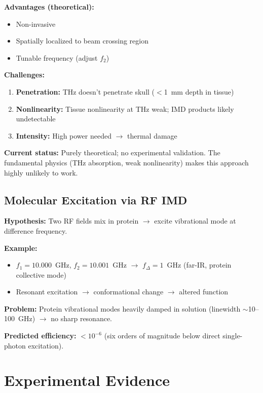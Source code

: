 \textbf{Advantages (theoretical):}
\begin{itemize}
\item Non-invasive
\item Spatially localized to beam crossing region
\item Tunable frequency (adjust $f_2$)
\end{itemize}

\textbf{Challenges:}
\begin{enumerate}
\item \textbf{Penetration:} THz doesn't penetrate skull ($<$1~mm depth in tissue)
\item \textbf{Nonlinearity:} Tissue nonlinearity at THz weak; IMD products likely undetectable
\item \textbf{Intensity:} High power needed $\rightarrow$ thermal damage
\end{enumerate}

\begin{warningbox}
\textbf{Current status:} Purely theoretical; no experimental validation. The fundamental physics (THz absorption, weak nonlinearity) makes this approach highly unlikely to work.
\end{warningbox}

\subsection{Molecular Excitation via RF IMD}

\textbf{Hypothesis:} Two RF fields mix in protein $\rightarrow$ excite vibrational mode at difference frequency.

\textbf{Example:}
\begin{itemize}
\item $f_1 = 10.000$~GHz, $f_2 = 10.001$~GHz $\rightarrow$ $f_{\Delta} = 1$~GHz (far-IR, protein collective mode)
\item Resonant excitation $\rightarrow$ conformational change $\rightarrow$ altered function
\end{itemize}

\textbf{Problem:} Protein vibrational modes heavily damped in solution (linewidth $\sim$10--100~GHz) $\rightarrow$ no sharp resonance.

\textbf{Predicted efficiency:} $<10^{-6}$ (six orders of magnitude below direct single-photon excitation).

\section{Experimental Evidence}


